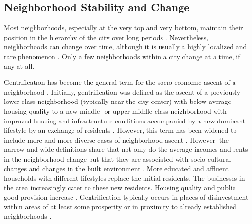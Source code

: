 \documentclass[a4paper,12pt]{article}
\begin{document}
\subsection{Neighborhood Stability and Change}

Most neighborhoods, especially at the very top and very bottom, maintain their position in the hierarchy of the city over long periods \citep{solariAffluentNeighborhoodPersistence2012, owensNeighborhoodsRiseTypology2012, rosenthalChangePersistenceEconomic2015}. Nevertheless, neighborhoods can change over time, although it is usually a highly localized and rare phenomenon \citep{solariAffluentNeighborhoodPersistence2012, owensNeighborhoodsRiseTypology2012, brown-saracinoExplicatingDividedApproaches2017}. Only a few neighborhoods within a city change at a time, if any at all. 

Gentrification has become the general term for the socio-economic ascent of a neighborhood \citep{owensNeighborhoodsRiseTypology2012}. Initially, gentrification was defined as the ascent of a previously lower-class neighborhood (typically near the city center) with below-average housing quality to a new middle- or upper-middle-class neighborhood with improved housing and infrastructure conditions accompanied by a new dominant lifestyle by an exchange of residents \citep{zukinGentrificationCultureCapital1987}. However, this term has been widened to include more and more diverse cases of neighborhood ascent \citep[530ff]{owensNeighborhoodsRiseTypology2012, brown-saracinoExplicatingDividedApproaches2017}. However, the narrow and wide definitions share that not only do the average incomes and rents in the neighborhood change but that they are associated with socio-cultural changes and changes in the built environment \citep{redfernWhatMakesGentrification2003}. More educated and affluent households with different lifestyles replace the initial residents. The businesses in the area increasingly cater to these new residents. Housing quality and public good provision increase \citep{zukinGentrificationCultureCapital1987}. Gentrification typically occurs in places of disinvestment within areas of at least some prosperity \citep{leyAlternativeExplanationsInnerCity1986, atkinsonEvidenceImpactGentrification2004} or in proximity to already established neighborhoods \citep{guerrieriEndogenousGentrificationHousing2013}.
\end{document}
